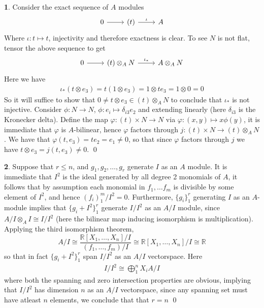 \documentclass[11pt]{article}
\theoremstyle{definition}
\newtheorem{pb}{}
\newcommand{\set}[1]{\{#1\}}
\begin{document}
    \begin{pb}
        Consider the exact sequence of \(A\) modules
        \begin{equation*}
            \begin{tikzcd}
                0 \arrow[r,"{}"] &(t) \arrow[r,"{\iota}"] & A
            \end{tikzcd}
        \end{equation*}
        Where \(\iota: t\mapsto t\), injectivity and therefore exactness is clear. To see \(N\) is not flat, tensor the above sequence to get
        \begin{equation*}
            \begin{tikzcd}
                0 \arrow[r,"{}"] &(t)\otimes_A N \arrow[r,"{\iota_*}"] &A \otimes_A N
            \end{tikzcd}
        \end{equation*}
        Here we have
        \begin{align*}
            \iota_*(t\otimes e_3) = t(1\otimes e_3) = 1\otimes t e_3 = 1 \otimes 0 = 0
        \end{align*}
        So it will suffice to show that \(0 \neq t \otimes e_3 \in (t)\otimes_A N\) to conclude that \(\iota_*\) is not injective. Consider \(\phi: N \to N\), \(\phi: e_i \mapsto \delta_{i3}e_2\) and extending linearly (here \(\delta_{i3}\) is the Kronecker delta). Define the map \(\varphi: (t) \times N \to N\) via \(\varphi: (x,y) \mapsto x\phi(y)\), it is immediate that \(\varphi\) is \(A\)-bilinear, hence \(\varphi\) factors through \(j: (t)\times N \to (t)\otimes_A N\). We have that \(\varphi(t,e_3) = te_2 = e_1 \neq 0\), so that since \(\varphi\) factors through \(j\) we have \(t \otimes e_3 = j(t,e_3) \neq 0\). \qed
    \end{pb}
    \begin{pb}
        Suppose that \(r \leq n\), and \(g_1,g_2,\hdots,g_r\) generate \(I\) as an \(A\) module. It is immediate that \(I^2\) is the ideal generated by all degree 2 monomials of \(A\), it follows that by assumption each monomial in \(f_1,\hdots f_m\) is divisible by some element of \(I^2\), and hence \((f_i)_1^m/I^2 = 0\). Furthermore, \(\set{g_i}_1^r\) generating \(I\) as an \(A\)-module implies that \(\set{g_i + I^2}_1^r\) generate \(I/I^2\) as an \(A/I\) module, since \(A/I \otimes_A I \cong I/I^2\) (here the bilinear map inducing isomorphism is multiplication). Applying the third isomorphism theorem, \[A/I \cong \frac{\mathbb{R}[X_1,\hdots,X_n]/I}{(f_1,\hdots,f_m)/I} \cong \mathbb{R}[X_1,\hdots,X_n]/I \cong \mathbb{R}\]
        so that in fact \(\set{g_i + I^2}_1^r\) span \(I/I^2\) as an \(A/I\) vectorspace. Here
        \begin{align*}
            I/I^2 \cong \bigoplus_1^n X_iA/I
        \end{align*}
        where both the spanning and zero intersection properties are obvious, implying that \(I/I^2\) has dimension \(n\) as an \(A/I\) vectorspace, since any spanning set must have atleast \(n\) elements, we conclude that that \(r = n\) \qed
    \end{pb}
\end{document}
